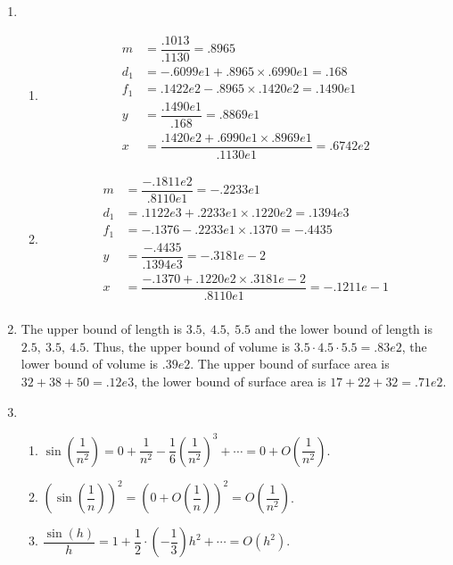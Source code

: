 \documentclass[12pt]{article}
\begin{document}
\begin{enumerate}
    \item \begin{enumerate}
        \item \begin{align*}
            m &= \dfrac{.1013}{.1130} = .8965\\
            d_1 &= -.6099e1 + .8965\times .6990e1 = .168\\
            f_1 &= .1422e2 - .8965 \times .1420e2 = .1490e1\\
            y &= \dfrac{.1490e1}{.168} = .8869e1\\
            x &= \dfrac{.1420e2 + .6990e1 \times .8969e1}{.1130e1} = .6742e2
        \end{align*}

        \item \begin{align*}
            m &= \dfrac{-.1811e2}{.8110e1} = -.2233e1\\
            d_1 &= .1122e3 + .2233e1 \times .1220e2 = .1394e3\\
            f_1 &= -.1376 - .2233e1 \times .1370 = -.4435\\
            y &= \dfrac{-.4435}{.1394e3} = -.3181e-2\\
            x &= \dfrac{-.1370 + .1220e2 \times .3181e-2}{.8110e1} = -.1211e-1\\
        \end{align*}
    \end{enumerate}

    \item The upper bound of length is $3.5,\ 4.5,\ 5.5$ and the lower bound of length is $2.5,\ 3.5,\ 4.5$.
    Thus, the upper bound of volume is $3.5 \cdot 4.5 \cdot 5.5 = .83e2$, the lower bound of volume is $.39e2$.
    The upper bound of surface area is $32 + 38 + 50 = .12e3$, the lower bound of surface area is $17 + 22 + 32 = .71e2$.

    \item \begin{enumerate}
        \item $\sin\left(\dfrac{1}{n^2}\right) = 0 + \dfrac{1}{n^2} - \dfrac{1}{6}\left(\dfrac{1}{n^2}\right)^3 + \cdots = 0 + O\left(\dfrac{1}{n^2}\right)$.

        \item $(\sin\left(\dfrac{1}{n}\right))^2 = (0 + O\left(\dfrac{1}{n}\right))^2 = O\left(\dfrac{1}{n^2}\right)$.
        
        \item $\dfrac{\sin(h)}{h} = 1 +  \dfrac{1}{2}\cdot (-\dfrac{1}{3}) h^2 + \cdots = O(h^2)$.
        

\end{enumerate}
\end{enumerate}
\end{document}
